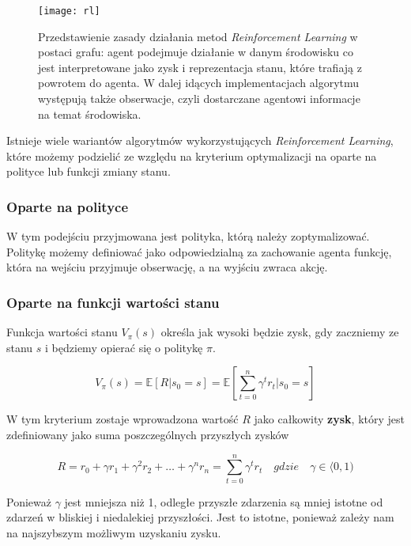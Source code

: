 \documentclass[12pt]{article}
\begin{document}
\begin{figure}[h]
\centering
\texttt{[image: rl]}
\caption{Przedstawienie zasady działania metod \emph{Reinforcement Learning} w postaci grafu: agent podejmuje działanie w danym środowisku co jest interpretowane jako zysk i reprezentacja stanu, które trafiają z powrotem do agenta. W dalej idących implementacjach algorytmu występują także obserwacje, czyli dostarczane agentowi informacje na temat środowiska.}
\end{figure}

Istnieje wiele wariantów algorytmów wykorzystujących \emph{Reinforcement Learning}, które możemy podzielić ze względu na kryterium optymalizacji na oparte na polityce lub funkcji zmiany stanu.

\subsubsection*{Oparte na polityce}
W tym podejściu przyjmowana jest polityka, którą należy zoptymalizować. Politykę możemy definiować jako odpowiedzialną za zachowanie agenta funkcję, która na wejściu przyjmuje obserwację, a na wyjściu zwraca akcję.  

\subsubsection*{Oparte na funkcji wartości stanu}
Funkcja wartości stanu $V_{\pi}(s)$ określa jak wysoki będzie zysk, gdy zaczniemy ze stanu $s$ i będziemy opierać się o politykę $\pi$. 

\[V_{\pi}(s) = \mathbb{E}[R | s_0=s] = \mathbb{E} \left[\sum_{t=0}^n \gamma^t r_t | s_0=s \right]\]

W tym kryterium zostaje wprowadzona wartość $R$ jako całkowity \textbf{zysk}, który jest zdefiniowany jako suma poszczególnych przyszłych zysków

\[R = r_{0} + \gamma r_1 + \gamma^2 r_2 + \ldots + \gamma^n r_n = \sum_{t=0}^n \gamma^t r_t \quad gdzie \quad \gamma \in \langle 0, 1)\]

Ponieważ $\gamma$ jest mniejsza niż 1, odległe przyszłe zdarzenia są mniej istotne od zdarzeń w bliskiej i niedalekiej przyszłości. Jest to istotne, ponieważ zależy nam na najszybszym możliwym uzyskaniu zysku.
\end{document}
